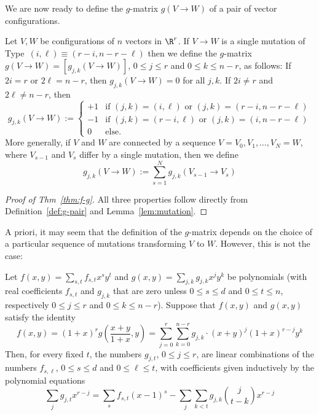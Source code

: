 %
We are now ready to define the $g$-matrix $g(V\rightarrow W)$ of a pair of vector configurations.  
\begin{definition}
\label{def:g-pair}
Let $V,W$ be configurations of $n$ vectors in $\R^r$. 
%
If $V\to W$ is a single mutation of Type~$(i,\ell)\equiv(r-i,n-r-\ell)$ then we define the $g$-matrix 
$g(V\rightarrow W)=[g_{j,k}(V\rightarrow W)]$, $0\leq j\leq r$ and $0\leq k \leq n-r$, as follows: 
%
If $2i=r$ or $2\ell=n-r$, then $g_{j,k}(V\to W)=0$ for all $j,k$. If $2i\neq r$ and $2\ell\neq n-r$, then
\[
g_{j,k}(V\to W):= 
\begin{cases}
  +1 & \textrm{if } (j,k)=(i,\ell) \textrm{ or }(j,k)=(r-i,n-r-\ell)\\
  -1 & \textrm{if } (j,k)=(r-i,\ell) \textrm{ or }(j,k)=(i,n-r-\ell)\\
  0 & \textrm{else.}  
\end{cases}
\]
%
%
More generally, if $V$ and $W$ are connected by a sequence $V=V_0, V_1,\dots, V_N=W$, where $V_{s-1}$ and $V_s$ differ by a single mutation, then we define
\[
g_{j,k}(V\to W):= \sum_{s=1}^N g_{j,k}(V_{s-1}\to V_s)
\]
\end{definition}
%
\begin{proof}[Proof of Thm~\ref{thm:f-g}]
All three properties follow directly from Definition~\ref{def:g-pair} and Lemma~\ref{lem:mutation}.
\end{proof}
%
A priori, it may seem that the definition of the $g$-matrix depends on the choice of a particular sequence of mutations transforming $V$ to $W$. However, this is not the case: 
%
\begin{lemma} 
\label{lem:g-f}
Let $f(x,y)=\sum_{s,t}f_{s,t}x^sy^t$ and $g(x,y)=\sum_{j,k} g_{j,k} x^j y^k$ be polynomials (with real coefficients $f_{s,t}$ and $g_{j,k}$ that are zero unless $0\leq s\leq d$ and $0\leq t\leq n$, respectively $0\leq j\leq r$ and $0\leq k\leq n-r$). Suppose that $f(x,y)$ and $g(x,y)$ satisfy the identity
\begin{equation}
\label{eq:f-g-to-be-inverted} 
f(x,y)= (1+x)^r g (\textstyle \frac{x+y}{1+x},y)=\sum_{j=0}^r \sum_{k=0}^{n-r} g_{j,k}\cdot (x+y)^j (1+x)^{r-j} y^k
\end{equation}
Then, for every fixed $t$, the numbers $g_{j,t}$, $0\leq j\leq r$, are linear combinations of the numbers $f_{s,\ell}$, $0\leq s\leq d$ and $0\leq \ell \leq t$, with coefficients given inductively by the polynomial equations 
\[
\sum_j g_{j,t} x^{r-j} = \sum_s f_{s,t} (x-1)^s - \sum_j \sum_{k<t} g_{j,k}\binom{j}{t-k}x^{r-j}
\]
\end{lemma}
